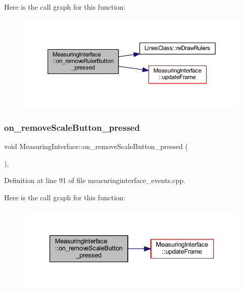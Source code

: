 Here is the call graph for this function\+:
\nopagebreak
\begin{figure}[H]
\begin{center}
\leavevmode
\includegraphics[width=350pt]{class_measuring_interface_a23015fd17f84f8b656cbf4e352b02604_cgraph}
\end{center}
\end{figure}
\mbox{\label{class_measuring_interface_ac406b351a7162743198aa64bbc2a9c46}} 
\subsubsection{\texorpdfstring{on\_removeScaleButton\_pressed}{on\_removeScaleButton\_pressed}}
{\footnotesize\ttfamily void Measuring\+Interface\+::on\+\_\+remove\+Scale\+Button\+\_\+pressed (\begin{DoxyParamCaption}{ }\end{DoxyParamCaption})\hspace{0.3cm}{\ttfamily [private]}, {\ttfamily [slot]}}



Definition at line 91 of file measuringinterface\+\_\+events.\+cpp.

Here is the call graph for this function\+:
\nopagebreak
\begin{figure}[H]
\begin{center}
\leavevmode
\includegraphics[width=336pt]{class_measuring_interface_ac406b351a7162743198aa64bbc2a9c46_cgraph}
\end{center}
\end{figure}
\mbox{\label{class_measuring_interface_a87fcf4623df1c9af6663fe236bb3dd0e}} 
